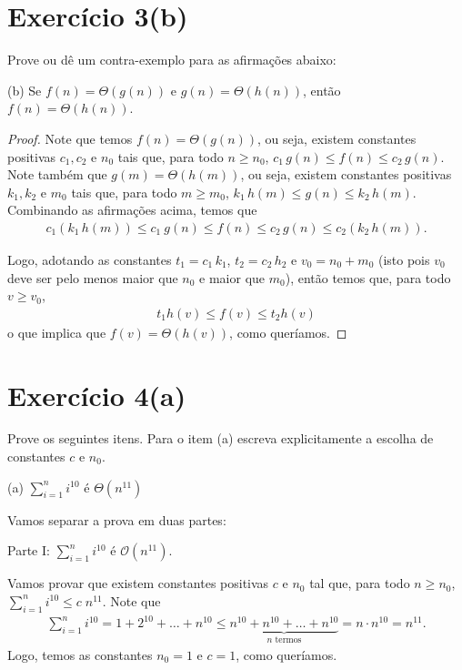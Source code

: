 \documentclass{article}
\newcommand{\bigO}[1]{\ensuremath{\mathcal{O}(#1)}}
\begin{document}
\newpage

\section*{Exercício 3(b)}
Prove ou dê um contra-exemplo para as afirmações abaixo:

(b) Se $f(n) = \Theta(g(n))$ e $g(n) = \Theta(h(n))$, então $f(n) = \Theta(h(n))$.

\begin{proof}
Note que temos $f(n) = \Theta(g(n))$, ou seja, existem constantes positivas $c_1, c_2$ e $n_0$ tais que, para todo $n \geq n_0$, $c_1 \, g(n) \leq f(n) \leq c_2 \, g(n)$.
Note também que $g(m) = \Theta(h(m))$, ou seja, existem constantes positivas $k_1, k_2$ e $m_0$ tais que, para todo $m \geq m_0$, $k_1 \, h(m) \leq g(n) \leq k_2 \, h(m)$.
Combinando as afirmações acima, temos que
\begin{align*}
  c_1 (k_1 \, h(m)) \leq c_1 \ g(n) \leq f(n) \leq c_2 \, g(n) \leq c_2 (k_2 \, h(m)) .
\end{align*}

Logo, adotando as constantes $t_1 = c_1 \, k_1$, $t_2 = c_2 \, h_2$ e $v_0 = n_0 + m_0$ (isto pois $v_0$ deve ser pelo menos maior que $n_0$ e maior que $m_0$), então temos que, para todo $v \geq v_0$,
\begin{align*}
  t_1 h(v) \leq f(v) \leq t_2 h(v)
\end{align*}
o que implica que $f(v) = \Theta(h(v))$, como queríamos.

\end{proof}

\newpage

\section*{Exercício 4(a)}
Prove os seguintes itens. Para o item (a) escreva explicitamente a escolha de constantes $c$ e $n_0$.

(a) $\sum_{i=1}^{n} i^{10}$ é $\Theta(n^{11})$

Vamos separar a prova em duas partes:

Parte I: $\sum_{i=1}^{n} i^{10}$ é $\bigO{n^{11}}$.

Vamos provar que existem constantes positivas $c$ e $n_0$ tal que, para todo $n \geq n_0$, $\sum_{i=1}^{n} i^{10} \leq c \; n^{11}$. Note que
\begin{align*}
  \sum_{i=1}^{n} i^{10} = 1 + 2^{10} + \dots + n^{10} \leq \underbrace{n^{10} + n^{10} + \dots + n^{10}}_\text{$n$ termos} = n \cdot n^{10} = n^{11}.
\end{align*}
Logo, temos as constantes $n_0 = 1$ e $c = 1$, como queríamos.
\end{document}
